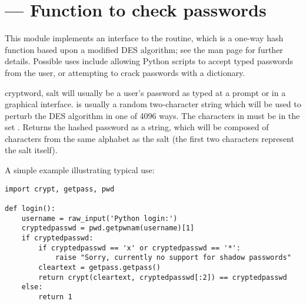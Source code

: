 \section{ ---
         Function to check \UNIX{} passwords}



This module implements an interface to the
 routine, which is a one-way hash
function based upon a modified DES algorithm; see
the \UNIX{} man page for further details.  Possible uses include
allowing Python scripts to accept typed passwords from the user, or
attempting to crack \UNIX{} passwords with a dictionary.

\begin{funcdesc}{crypt}{word, salt} 
   will usually be a user's password as typed at a prompt or 
  in a graphical interface.   is usually a random
  two-character string which will be used to perturb the DES algorithm
  in one of 4096 ways.  The characters in  must be in the
  set \regexp{[./a-zA-Z0-9]}.  Returns the hashed password as a
  string, which will be composed of characters from the same alphabet
   as the salt (the first two characters represent the salt itself).
\end{funcdesc}


A simple example illustrating typical use:

\begin{verbatim}
import crypt, getpass, pwd

def login():
    username = raw_input('Python login:')
    cryptedpasswd = pwd.getpwnam(username)[1]
    if cryptedpasswd:
        if cryptedpasswd == 'x' or cryptedpasswd == '*': 
            raise "Sorry, currently no support for shadow passwords"
        cleartext = getpass.getpass()
        return crypt(cleartext, cryptedpasswd[:2]) == cryptedpasswd
    else:
        return 1
\end{verbatim}
